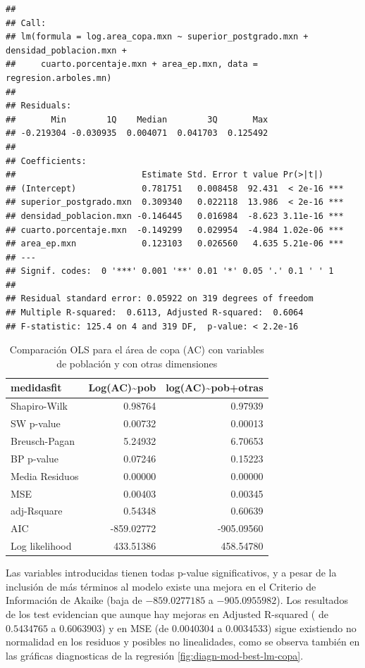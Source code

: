 \documentclass[12pt,]{book}
\begin{document}
\begin{verbatim}
## 
## Call:
## lm(formula = log.area_copa.mxn ~ superior_postgrado.mxn + densidad_poblacion.mxn + 
##     cuarto.porcentaje.mxn + area_ep.mxn, data = regresion.arboles.mn)
## 
## Residuals:
##       Min        1Q    Median        3Q       Max 
## -0.219304 -0.030935  0.004071  0.041703  0.125492 
## 
## Coefficients:
##                         Estimate Std. Error t value Pr(>|t|)    
## (Intercept)             0.781751   0.008458  92.431  < 2e-16 ***
## superior_postgrado.mxn  0.309340   0.022118  13.986  < 2e-16 ***
## densidad_poblacion.mxn -0.146445   0.016984  -8.623 3.11e-16 ***
## cuarto.porcentaje.mxn  -0.149299   0.029954  -4.984 1.02e-06 ***
## area_ep.mxn             0.123103   0.026560   4.635 5.21e-06 ***
## ---
## Signif. codes:  0 '***' 0.001 '**' 0.01 '*' 0.05 '.' 0.1 ' ' 1
## 
## Residual standard error: 0.05922 on 319 degrees of freedom
## Multiple R-squared:  0.6113, Adjusted R-squared:  0.6064 
## F-statistic: 125.4 on 4 and 319 DF,  p-value: < 2.2e-16
\end{verbatim}

\begin{table}

\caption{\label{tab:comp-lmcopa-pob-mod}Comparación OLS para el área de copa (AC) con variables de población y con otras dimensiones}
\centering
\begin{tabular}[t]{l|r|r}
\hline
medidasfit & Log(AC)\textasciitilde{}pob & log(AC)\textasciitilde{}pob+otras\\
\hline
Shapiro-Wilk & 0.98764 & 0.97939\\
\hline
SW p-value & 0.00732 & 0.00013\\
\hline
Breusch-Pagan & 5.24932 & 6.70653\\
\hline
BP p-value & 0.07246 & 0.15223\\
\hline
Media Residuos & 0.00000 & 0.00000\\
\hline
MSE & 0.00403 & 0.00345\\
\hline
adj-Rsquare & 0.54348 & 0.60639\\
\hline
AIC & -859.02772 & -905.09560\\
\hline
Log likelihood & 433.51386 & 458.54780\\
\hline
\end{tabular}
\end{table}

Las variables introducidas tienen todas p-value significativos, y a
pesar de la inclusión de más términos al modelo existe una mejora en el
Criterio de Información de Akaike (baja de \(-859.0277185\) a
\(-905.0955982\)). Los resultados de los test evidencian que aunque hay
mejoras en Adjusted R-squared ( de \(0.5434765\) a \(0.6063903\)) y en
MSE (de \(0.0040304\) a \(0.0034533\)) sigue existiendo no normalidad en
los residuos y posibles no linealidades, como se observa también en las
gráficas diagnosticas de la regresión \ref{fig:diagn-mod-best-lm-copa}.
\end{document}

